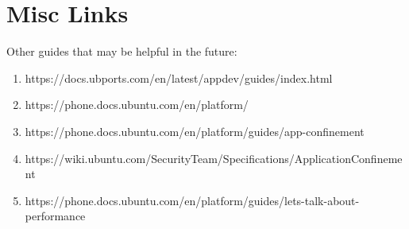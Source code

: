 \section{Misc Links}



Other guides that may be helpful in the future:
\begin{enumerate}
	\item https://docs.ubports.com/en/latest/appdev/guides/index.html
	\item https://phone.docs.ubuntu.com/en/platform/
	\item https://phone.docs.ubuntu.com/en/platform/guides/app-confinement
	\item https://wiki.ubuntu.com/SecurityTeam/Specifications/ApplicationConfinement
	\item https://phone.docs.ubuntu.com/en/platform/guides/lets-talk-about-performance
\end{enumerate}